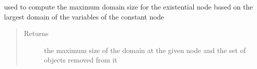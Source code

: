 \documentclass[letterpaper,10pt,english,openany,oneside]{sphinxmanual}
\begin{document}
\begin{fulllineitems}
\begin{fulllineitems}
\label{\detokenize{index:circuit.ConstNode.maxDomainSize}}
used to compute the maximum domain size for the existential node based on the largest domain of the variables of the constant node
\begin{quote}\begin{description}
\item[{Returns}] \leavevmode
the maximum size of the domain at the given node and the set of objects removed from it

\end{description}\end{quote}

\end{fulllineitems}


\end{fulllineitems}

\end{document}
